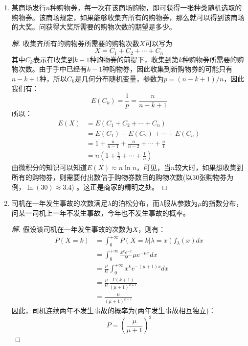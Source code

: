 \documentclass[12pt]{article}
\newcommand{\hei}{\CJKfamily{hei}}                          %
\begin{document}
\begin{enumerate}
\item {\hei 某商场发行$n$种购物券，每一次在该商场购物，即可获得一张种类随机选取的购物券。该商场规定，如果能够收集齐所有的购物券，那么就可以得到该商场的大奖。问获得大奖所需要的购物次数的期望是多少。}

\begin{proof}[解]
	收集齐所有的购物券所需要的购物次数$X$可以写为
	\begin{equation}
	X=C_1+C_2+\cdots+C_n
	\end{equation}
	其中$C_k$表示在收集到$k-1$种购物券的前提下，收集到第$k$种购物券所需要的购物次数。由于手中已经有$k-1$种购物券，因此收集到新购物券的可能只有$n-k+1$种，所以$C_k$是几何分布随机变量，参数为$p=(n-k+1)/n$，因此我们有：
	\begin{equation}
	E(C_k)=\frac{1}{p}=\frac{n}{n-k+1}
	\end{equation}
	所以：
	\begin{equation}
	\begin{aligned}
	E(X)&=E(C_1+C_2+\cdots+C_n)\\
	&=E(C_1)+E(C_2)+\cdots+E(C_n) \\
	&=1+\frac{n}{n-1}+\frac{n}{n-2}+\cdots+\frac{n}{1} \\
	&=n\left(1+\frac{1}{2}+\cdots+\frac{1}{n}\right)
	\end{aligned}
	\end{equation}
	由微积分的知识可以知道$E(X)\approx n\ln n$，可见，当$n$较大时，如果想收集到所有的购物券，则需要付出数倍于购物券数目的购物次数(以30张购物券为例，$\ln(30)\approx3.4$) 。这正是商家的精明之处。
\end{proof}

\item {\hei 司机在一年发生事故的次数满足$\lambda$的泊松分布，而$\lambda$服从参数为$\mu$的指数分布，问某一司机上一年不发生事故，今年也不发生事故的概率。}
\begin{proof}[解]
	假设该司机在一年发生事故的次数为$X$，则有：
	\begin{equation}
	\begin{aligned}
	P(X=k)&=\int_{0}^{+\infty}P(X=k|\lambda=x)f_{\lambda}(x)dx \\
	&=\int_{0}^{+\infty}\frac{x^ke^{-x}}{k!}\mu e^{-\mu x}dx \\
	&=\frac{\mu}{k!}\int_{0}^{+\infty}x^ke^{-(\mu+1)x}dx \\
	&=\frac{\mu}{k!}\frac{\Gamma(k+1)}{(\mu+1)^{k+1}} \\
	&=\frac{\mu}{(\mu+1)^{k+1}}
	\end{aligned}
	\end{equation}
	因此，司机连续两年不发生事故的概率为(两年发生事故相互独立)：
	\begin{equation}
	P=\left(\frac{\mu}{\mu+1}\right)^2
	\end{equation}
\end{proof}


\end{enumerate}
\end{document}
